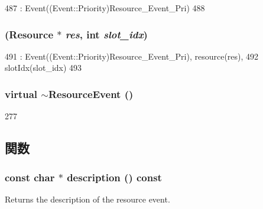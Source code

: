 \begin{DoxyCode}
487     : Event((Event::Priority)Resource_Event_Pri)
488 { }
\end{DoxyCode}
\hypertarget{classResourceEvent_a8fa1f116a7d1e348370d76d05e0616ea}{
\subsubsection[{ResourceEvent}]{ ({\bf Resource} $\ast$ {\em res}, \/  int {\em slot\_\-idx})}}
\label{classResourceEvent_a8fa1f116a7d1e348370d76d05e0616ea}



\begin{DoxyCode}
491   : Event((Event::Priority)Resource_Event_Pri), resource(res),
492       slotIdx(slot_idx)
493 { }
\end{DoxyCode}
\hypertarget{classResourceEvent_afc726427e1e30058d481924bf372e245}{
\subsubsection[{$\sim$ResourceEvent}]{\setlength{\rightskip}{0pt plus 5cm}virtual $\sim${\bf ResourceEvent} ()}}
\label{classResourceEvent_afc726427e1e30058d481924bf372e245}



\begin{DoxyCode}
277 { }
\end{DoxyCode}


\subsection{関数}
\hypertarget{classResourceEvent_a5a14fe478e2393ff51f02e9b7be27e00}{
\subsubsection[{description}]{\setlength{\rightskip}{0pt plus 5cm}const char $\ast$ description () const}}
\label{classResourceEvent_a5a14fe478e2393ff51f02e9b7be27e00}
Returns the description of the resource event. 

